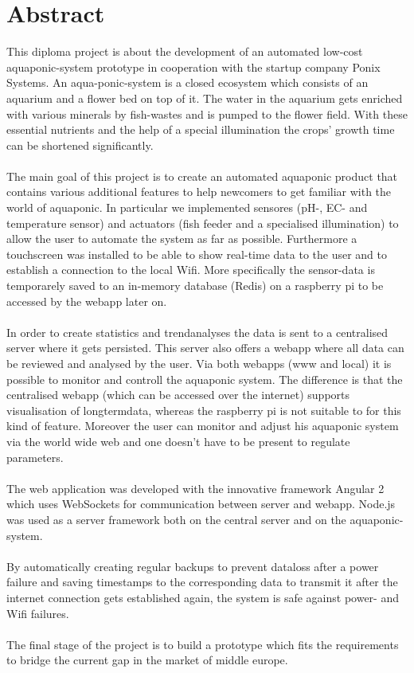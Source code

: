\section*{Abstract}

This diploma project is about the development of an automated low-cost aquaponic-system prototype in cooperation with the startup company Ponix Systems. An aqua-ponic-system is a closed ecosystem which consists of an aquarium and a flower bed on top of it. The water in the aquarium gets enriched with various minerals by fish-wastes and is pumped to the flower field. With these essential nutrients and the help of a special illumination the crops' growth time can be shortened significantly. \\ \mbox{} \\
The main goal of this project is to create an automated aquaponic product that contains various additional features to help newcomers to get familiar with the world of aquaponic. In particular we implemented sensores (pH-, EC- and temperature sensor) and actuators (fish feeder and a specialised illumination) to allow the user to automate the system as far as possible. Furthermore a touchscreen was installed to be able to show real-time data to the user and to establish a connection to the local Wifi. More specifically the sensor-data is temporarely saved to an in-memory database (Redis) on a raspberry pi to be accessed by the webapp later on. \\ \mbox{} \\
In order to create statistics and trendanalyses the data is sent to a centralised server where it gets persisted. This server also offers a webapp where all data can be reviewed and analysed by the user. Via both webapps (www and local) it is possible to monitor and controll the aquaponic system. The difference is that the centralised webapp (which can be accessed over the internet) supports visualisation of longtermdata, whereas the raspberry pi is not suitable to for this kind of feature. Moreover the user can monitor and adjust his aquaponic system via the world wide web and one doesn't have to be present to regulate parameters. \\ \mbox{} \\
The web application was developed with the innovative framework Angular 2 which uses WebSockets for communication between server and webapp. Node.js was used as a server framework both on the central server and on the aquaponic-system. \\ \mbox{} \\
By automatically creating regular backups to prevent dataloss after a power failure and saving timestamps to the corresponding data to transmit it after the internet connection gets established again, the system is safe against power- and Wifi failures. \\ \mbox{} \\
The final stage of the project is to build a prototype which fits the requirements to bridge the current gap in the market of middle europe.